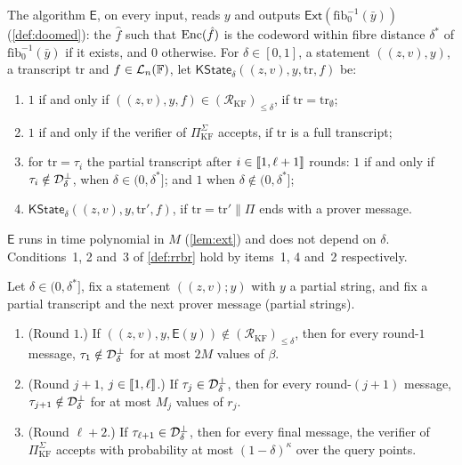 \begin{definition}\label{def:kstate}
The algorithm $\mathsf{E}$, on every input, reads $y$ and outputs $\mathsf{Ext}(\mathrm{fib}_0^{-1}(\bar y))$ (\cref{def:doomed}): the $\hat f$ such that $\mathrm{Enc}(\hat f)$ is the codeword within fibre distance $\delta^*$ of $\mathrm{fib}_0^{-1}(\bar y)$ if it exists, and $0$ otherwise.
For $\delta \in [0,1]$, a statement $((z,v), y)$, a transcript $\mathrm{tr}$ and $f \in \mathcal{L}_n(\mathbb{F})$, let $\mathsf{KState}_\delta((z,v), y, \mathrm{tr}, f)$ be:
\begin{enumerate}
  \item $1$ if and only if $((z,v), y, f) \in (\mathcal{R}_{\mathrm{KF}})_{\le\delta}$, if $\mathrm{tr} = \mathrm{tr}_\emptyset$;
  \item $1$ if and only if the verifier of $\Pi^\Sigma_{\mathrm{KF}}$ accepts, if $\mathrm{tr}$ is a full transcript;
  \item for $\mathrm{tr} = \tau_i$ the partial transcript after $i \in \llbracket 1, \ell+1 \rrbracket$ rounds: $1$ if and only if $\tau_i \notin \mathcal{D}^\bot_\delta$, when $\delta \in (0,\delta^*]$; and $1$ when $\delta \notin (0,\delta^*]$;
  \item $\mathsf{KState}_\delta((z,v), y, \mathrm{tr}', f)$, if $\mathrm{tr} = \mathrm{tr}' \| \Pi$ ends with a prover message.
\end{enumerate}
\end{definition}

$\mathsf{E}$ runs in time polynomial in $M$ (\cref{lem:ext}) and does not depend on $\delta$. Conditions~1, 2 and~3 of \cref{def:rrbr} hold by items~1, 4 and~2 respectively.

\begin{lemma}\label{lem:rbr-erasures}
Let $\delta \in (0,\delta^*]$, fix a statement $((z,v);y)$ with $y$ a partial string, and fix a partial transcript and the next prover message (partial strings).
\begin{enumerate}
  \item (Round $1$.) If $((z,v), y, \mathsf{E}(y)) \notin (\mathcal{R}_{\mathrm{KF}})_{\le\delta}$, then for every round-$1$ message, $\tau_1 \notin \mathcal{D}^\bot_\delta$ for at most $2M$ values of $\beta$.
  \item (Round $j+1$, $j \in \llbracket 1, \ell \rrbracket$.) If $\tau_j \in \mathcal{D}^\bot_\delta$, then for every round-$(j+1)$ message, $\tau_{j+1} \notin \mathcal{D}^\bot_\delta$ for at most $M_j$ values of $r_j$.
  \item (Round $\ell+2$.) If $\tau_{\ell+1} \in \mathcal{D}^\bot_\delta$, then for every final message, the verifier of $\Pi^\Sigma_{\mathrm{KF}}$ accepts with probability at most $(1-\delta)^\kappa$ over the query points.
\end{enumerate}
\end{lemma}

